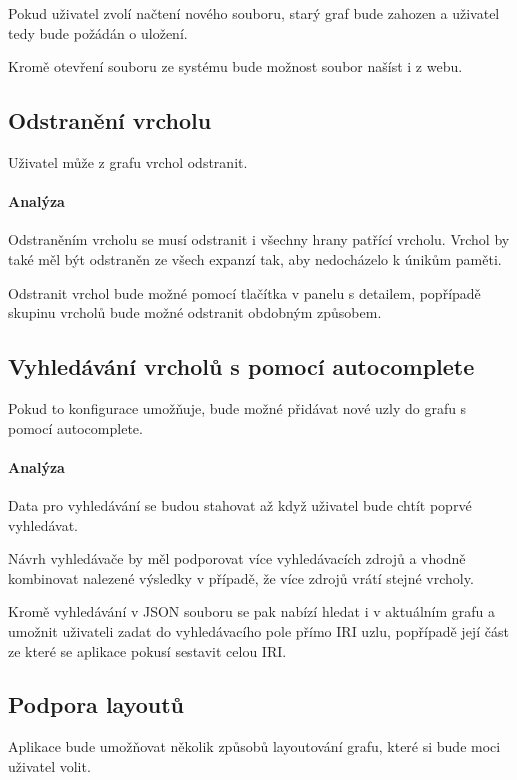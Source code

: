 Pokud uživatel zvolí načtení nového souboru, starý graf bude zahozen a uživatel tedy bude požádán o uložení.

Kromě otevření souboru ze systému bude možnost soubor našíst i z webu.

\subsection*{Odstranění vrcholu}
Uživatel může z grafu vrchol odstranit.

\paragraph{Analýza} Odstraněním vrcholu se musí odstranit i všechny hrany patřící vrcholu. Vrchol by také měl být odstraněn ze všech expanzí tak, aby nedocházelo k únikům paměti.

Odstranit vrchol bude možné pomocí tlačítka v panelu s detailem, popřípadě skupinu vrcholů bude možné odstranit obdobným způsobem.

\subsection*{Vyhledávání vrcholů s pomocí autocomplete}
Pokud to konfigurace umožňuje, bude možné přidávat nové uzly do grafu s pomocí autocomplete.

\paragraph{Analýza} Data pro vyhledávání se budou stahovat až když uživatel bude chtít poprvé vyhledávat.

Návrh vyhledávače by měl podporovat více vyhledávacích zdrojů a vhodně kombinovat nalezené výsledky v případě, že více zdrojů vrátí stejné vrcholy.

Kromě vyhledávání v JSON souboru se pak nabízí hledat i v aktuálním grafu a umožnit uživateli zadat do vyhledávacího pole přímo IRI uzlu, popřípadě její část ze které se aplikace pokusí sestavit celou IRI.

\subsection*{Podpora layoutů}
Aplikace bude umožňovat několik způsobů layoutování grafu, které si bude moci uživatel volit.

